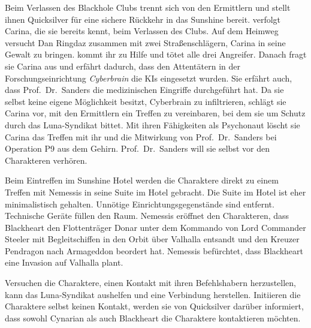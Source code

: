 

Beim Verlassen des Blackhole Clubs trennt sich \xl{} von den Ermittlern und stellt ihnen Quicksilver für eine sichere Rückkehr in das Sunshine bereit. \xl{} verfolgt Carina, die sie bereits kennt, beim Verlassen des Clubs. Auf dem Heimweg versucht Dan Ringdaz zusammen mit zwei Straßenschlägern, Carina in seine Gewalt zu bringen. \xl{} kommt ihr zu Hilfe und tötet alle drei Angreifer. Danach fragt sie Carina aus und erfährt dadurch, dass den Attentätern in der Forschungseinrichtung \emph{Cyberbrain} die KIs eingesetzt wurden. Sie erfährt auch, dass Prof.~Dr.~Sanders die medizinischen Eingriffe durchgeführt hat. Da sie selbst keine eigene Möglichkeit besitzt, Cyberbrain zu infiltrieren, schlägt sie Carina vor, mit den Ermittlern ein Treffen zu vereinbaren, bei dem sie um Schutz durch das Luna-Syndikat bittet. Mit ihren Fähigkeiten als Psychonaut löscht sie Carina das Treffen mit ihr und die Mitwirkung von Prof.~Dr.~Sanders bei Operation P9 aus dem Gehirn. Prof.~Dr.~Sanders will sie selbst vor den Charakteren verhören.


Beim Eintreffen im Sunshine Hotel werden die Charaktere direkt zu einem Treffen mit Nemessis in seine Suite im Hotel gebracht. Die Suite im Hotel ist eher minimalistisch gehalten. Unnötige Einrichtungsgegenstände sind entfernt. Technische Geräte füllen den Raum. Nemessis eröffnet den Charakteren, dass Blackheart den Flottenträger Donar unter dem Kommando von Lord Commander Steeler mit Begleitschiffen in den Orbit über Valhalla entsandt und den Kreuzer Pendragon nach Armageddon beordert hat. Nemessis befürchtet, dass Blackheart eine Invasion auf Valhalla plant.

Versuchen die Charaktere, einen Kontakt mit ihren Befehlshabern herzustellen, kann das Luna-Syndikat aushelfen und eine Verbindung herstellen. Initiieren die Charaktere selbst keinen Kontakt, werden sie von Quicksilver darüber informiert, dass sowohl Cynarian als auch Blackheart die Charaktere kontaktieren möchten.


